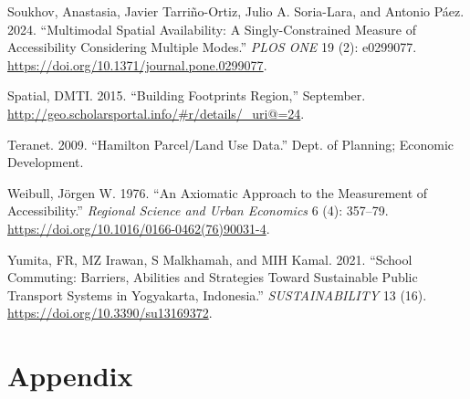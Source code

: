\documentclass[
default
]{sn-jnl}
\newlength{\cslhangindent}
\newenvironment{CSLReferences}[2] %
 {\begin{list}{}{%
  \setlength{\itemindent}{0pt}
  \setlength{\leftmargin}{0pt}
  \setlength{\parsep}{0pt}
  \ifodd #1
   \setlength{\leftmargin}{\cslhangindent}
   \setlength{\itemindent}{-1\cslhangindent}
  \fi
  \setlength{\itemsep}{#2\baselineskip}}}
 {\end{list}}
\begin{document}
\begin{CSLReferences}{1}{0}
Soukhov, Anastasia, Javier Tarriño-Ortiz, Julio A. Soria-Lara, and
Antonio Páez. 2024. {``Multimodal Spatial Availability: A
Singly-Constrained Measure of Accessibility Considering Multiple
Modes.''} \emph{{PLOS} {ONE}} 19 (2): e0299077.
\url{https://doi.org/10.1371/journal.pone.0299077}.

Spatial, DMTI. 2015. {``Building Footprints Region,''} September.
\url{http://geo.scholarsportal.info/\#r/details/_uri@=24}.

Teranet. 2009. {``Hamilton Parcel/Land Use Data.''} Dept. of Planning;
Economic Development.

Weibull, Jörgen W. 1976. {``An Axiomatic Approach to the Measurement of
Accessibility.''} \emph{Regional Science and Urban Economics} 6 (4):
357--79. \url{https://doi.org/10.1016/0166-0462(76)90031-4}.

Yumita, FR, MZ Irawan, S Malkhamah, and MIH Kamal. 2021. {``School
Commuting: Barriers, Abilities and Strategies Toward Sustainable Public
Transport Systems in Yogyakarta, Indonesia.''} \emph{{SUSTAINABILITY}}
13 (16). \url{https://doi.org/10.3390/su13169372}.

\end{CSLReferences}

\pagebreak

\section{Appendix}\label{appendix}


\end{document}
